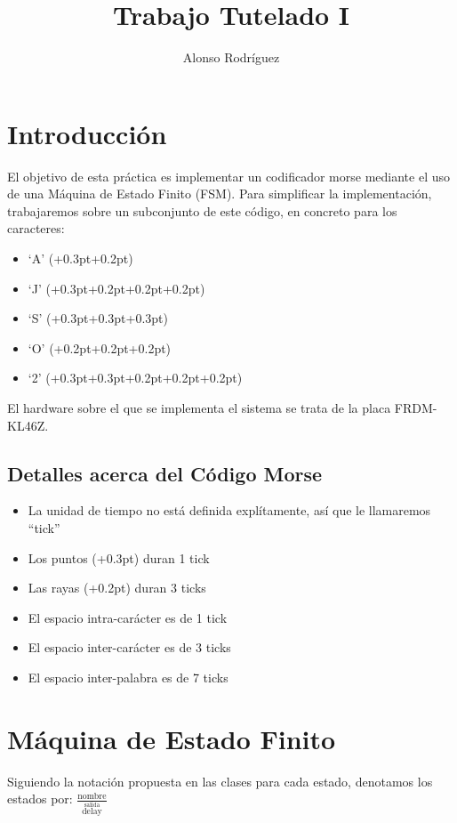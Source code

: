 \documentclass[a4paper,openright,12pt]{article}
\newcommand{\punto}{\kern+0.3pt\raisebox{0.35ex}{\huge\textbf.}}
\newcommand{\raya}{\kern+0.2pt\raisebox{-0.35ex}{\huge\textbf-}}
\begin{document}
\author {Alonso Rodríguez}
\title {Trabajo Tutelado I}

\maketitle

\justifying{}

\section{Introducción}
El objetivo de esta práctica es implementar un codificador morse mediante el uso de una Máquina de Estado Finito (FSM).
Para simplificar la implementación, trabajaremos sobre un subconjunto de este código, en concreto para los caracteres:
\begin{itemize}
    \item `A' (\punto\raya)
    \item `J' (\punto\raya\raya\raya)
    \item `S' (\punto\punto\punto)
    \item `O' (\raya\raya\raya)
    \item `2' (\punto\punto\raya\raya\raya)
\end{itemize} 

El hardware sobre el que se implementa el sistema se trata de la placa FRDM-KL46Z.

\subsection{Detalles acerca del Código Morse}
\begin{itemize}
    \item La unidad de tiempo no está definida explítamente, así que le llamaremos ``tick''
    \item Los puntos (\punto) duran 1 tick
    \item Las rayas (\raya) duran 3 ticks
    \item El espacio intra-carácter es de 1 tick
    \item El espacio inter-carácter es de 3 ticks
    \item El espacio inter-palabra es de 7 ticks
\end{itemize}


\section{Máquina de Estado Finito}
Siguiendo la notación propuesta en las clases para cada estado, denotamos los estados por: $\frac{\text{nombre}}{\overset{\text{salida}}{\text{delay}}}$
\end{document}
